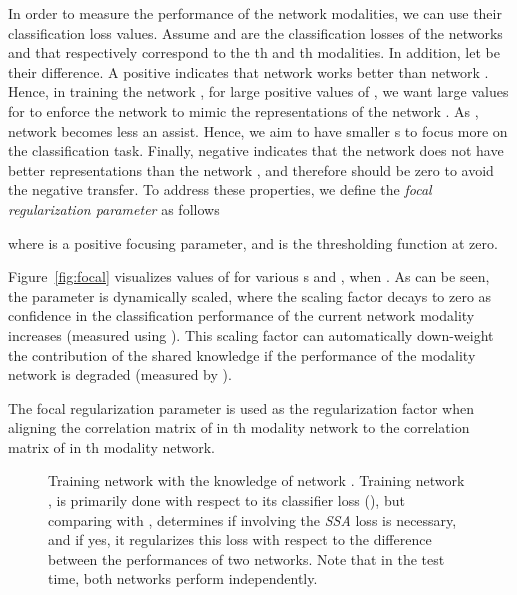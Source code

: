\documentclass[10pt,twocolumn,letterpaper]{article}
\begin{document}
In order to measure the performance of the network modalities, we can use their classification loss values.  Assume  and  are the classification losses of the networks  and  that respectively correspond to the th and th modalities. In addition, let  be their difference. A positive  indicates that network  works better than network .  Hence,  in training the network , for large positive values of , we want large values for  to enforce the network to mimic the representations of the network .   As , network  becomes less an assist. Hence, we aim to have smaller s to focus more on the classification task.   Finally, negative  indicates that the network  does not have better representations than the network , and therefore  should be zero to avoid the negative transfer.   To address these properties, we define the \emph{focal regularization parameter} as follows

where  is a  positive focusing parameter, and  is the thresholding function at zero.

Figure~\ref{fig:focal} visualizes values of  for various s and , when  .   As can be seen, the parameter is dynamically scaled, where the scaling factor decays to zero as confidence in the classification performance of the current network modality increases (measured using ). This scaling factor can automatically down-weight the contribution of the shared knowledge if the performance of the modality network  is degraded (measured by ).


The focal regularization parameter  is used as the regularization factor when aligning the correlation matrix of  in th modality network to the correlation matrix of  in th modality network.   



\begin{figure}
\begin{center}
\end{center}
   \caption{Training network  with the knowledge of network .  Training network , is primarily done with respect to its classifier loss (), but comparing with ,  determines if involving the \emph{SSA} loss is necessary, and if yes, it regularizes this loss with respect to the difference between the performances of two networks. Note that in the test time, both networks perform independently.}
\label{fig:diagram}
\end{figure}
\end{document}

